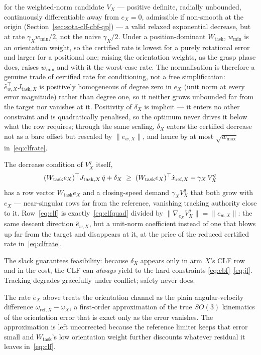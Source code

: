 for the weighted-norm candidate $V_X$ --- positive definite, radially unbounded, continuously differentiable away from $e_X = 0$, admissible if non-smooth at the origin (Section~\ref{sec:sota-clf-cbf-qp}) --- a valid relaxed exponential decrease, but at rate $\gamma_X w_{\min}/2$, not the naive $\gamma_X/2$. Under a position-dominant $W_{\text{task}}$, $w_{\min}$ is an orientation weight, so the certified rate is lowest for a purely rotational error and larger for a positional one; raising the orientation weights, as the grasp phase does, raises $w_{\min}$ and with it the worst-case rate. The normalisation is therefore a genuine trade of certified rate for conditioning, not a free simplification: $\hat{e}_{w,X}^{\top}J_{\text{task},X}$ is positively homogeneous of degree zero in $e_X$ (unit norm at every error magnitude) rather than degree one, so it neither grows unbounded far from the target nor vanishes at it. Positivity of $\delta_X$ is implicit --- it enters no other constraint and is quadratically penalised, so the optimum never drives it below what the row requires; through the same scaling, $\delta_X$ enters the certified decrease not as a bare offset but rescaled by $\|e_{w,X}\|$, and hence by at most $\sqrt{w_{\max}}$ in~\eqref{eq:clfrate}.

The decrease condition of $V_X^{q}$ itself,
\begin{equation}
(W_{\text{task}}e_X)^{\top} J_{\text{task},X}\,\dot{q} + \delta_X
\;\ge\;
(W_{\text{task}}e_X)^{\top}\dot{x}_{\text{ref},X} + \gamma_X\, V_X^{q}
\label{eq:clfquad}
\end{equation}
has a row vector $W_{\text{task}}e_X$ and a closing-speed demand $\gamma_X V_X^{q}$ that both grow with $e_X$ --- near-singular rows far from the reference, vanishing tracking authority close to it. Row~\eqref{eq:clf} is exactly~\eqref{eq:clfquad} divided by $\|\nabla_{e_X} V_X^{q}\| = \|e_{w,X}\|$: the same descent direction $\hat{e}_{w,X}$, but a unit-norm coefficient instead of one that blows up far from the target and disappears at it, at the price of the reduced certified rate in~\eqref{eq:clfrate}.

The slack guarantees feasibility: because $\delta_X$ appears only in arm $X$'s CLF row and in the cost, the CLF can \emph{always} yield to the hard constraints \eqref{eq:cbf}--\eqref{eq:jl}. Tracking degrades gracefully under conflict; safety never does.

The rate $\dot{e}_X$ above treats the orientation channel as the plain angular-velocity difference $\omega_{\text{ref},X} - \omega_X$, a first-order approximation of the true $SO(3)$ kinematics of the orientation error that is exact only as the error vanishes. The approximation is left uncorrected because the reference limiter keeps that error small and $W_{\text{task}}$'s low orientation weight further discounts whatever residual it leaves in~\eqref{eq:clf}.

